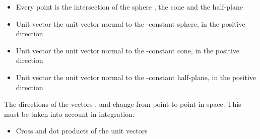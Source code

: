 \begin{ELunit}


\begin{itemize}
\tightlist
\item
  Every point  is the intersection of the sphere , the cone  and the half-plane 
\item
  Unit vector  \ELim{\ELto} the unit vector normal to the -constant sphere, in the positive direction
\item
  Unit vector \ELim{\uvec{\theta}} \ELim{\ELto} the unit vector normal to the \ELim{\theta}-constant cone, in the positive direction
\item
  Unit vector \ELim{\uvec{\phi}} \ELim{\ELto} the unit vector normal to the \ELim{\phi}-constant half-plane, in the positive direction
\end{itemize}

\end{ELunit}

\begin{ELremark}{}

The directions of the vectors , \ELim{\uvec{\theta}} and \ELim{\uvec{\phi}} change from point to point in space. This must be taken into account in integration.

\end{ELremark}

\begin{ELunit}

\begin{itemize}
\tightlist
\item
  Cross and dot products of the unit vectors
\end{itemize}




\end{ELunit}

